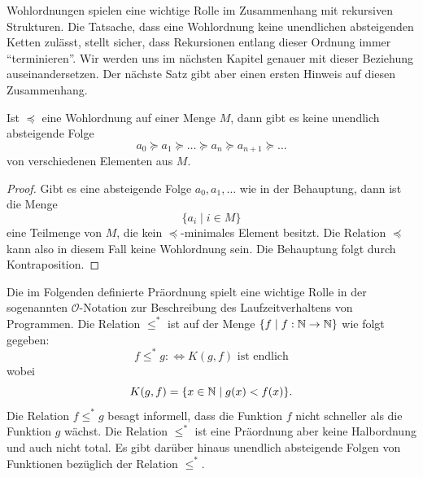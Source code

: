     \begin{rk}
    Wohlordnungen spielen eine wichtige Rolle im Zusammenhang mit rekursiven Strukturen. Die Tatsache, dass eine Wohlordnung keine unendlichen absteigenden Ketten zulässt, stellt sicher, dass Rekursionen entlang dieser Ordnung immer ``terminieren''. Wir werden uns im nächsten Kapitel genauer mit dieser Beziehung auseinandersetzen. Der nächste Satz gibt aber einen ersten Hinweis auf diesen Zusammenhang.
    \end{rk}

    \begin{satz}
    Ist $\preceq$ eine Wohlordnung auf einer Menge $M$, dann gibt es keine unendlich absteigende Folge
    \[
    a_0\succeq a_1\succeq\dots\succeq a_n\succeq a_{n+1}\succeq\dots
    \]
    von verschiedenen Elementen aus $M$.
    \end{satz}
    \begin{proof}
    Gibt es eine absteigende Folge $a_0,a_1,\dots$ wie in der Behauptung, dann ist die Menge
    \[
    \{a_i\mid i\in M\}
    \]
    eine Teilmenge von $M$, die kein $\preceq$-minimales Element besitzt. Die Relation $\preceq$ kann also in diesem Fall keine Wohlordnung sein. Die Behauptung folgt durch Kontraposition.
    \end{proof}

    \begin{bsp}
    Die im Folgenden definierte Präordnung spielt eine wichtige Rolle in der sogenannten $\mathcal{O}$-Notation zur Beschreibung des Laufzeitverhaltens von Programmen. Die Relation $\leq^*$ ist auf der Menge $\{f\mid f:\mathbb{N}\to\mathbb{N} \}$ wie folgt gegeben:
    \[
    f\leq^* g:\Leftrightarrow K(g,f)\text{ ist endlich}
    \]
    wobei
    \[
    K(g,f)=\{x\in \mathbb{N}\mid g(x)<f(x) \}.
    \]
    Die Relation $f\leq^* g$ besagt informell, dass die Funktion $f$ nicht schneller als die Funktion $g$ wächst. Die Relation $\leq^*$ ist eine Präordnung aber keine Halbordnung und auch nicht total. Es gibt darüber hinaus unendlich absteigende Folgen von Funktionen bezüglich der Relation $\leq^*$.
    \end{bsp}



